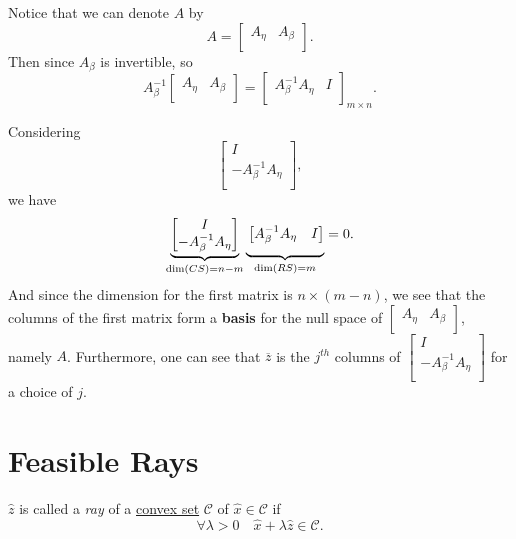 \begin{note}
	Notice that we can denote \(A\) by
	\[
		A = \begin{bmatrix}
			A_{\eta} & A_{\beta} \\
		\end{bmatrix}.
	\]
	Then since \(A_{\beta}\) is invertible, so
	\[
		A^{-1}_{\beta}\begin{bmatrix}
			A_{\eta} & A_{\beta} \\
		\end{bmatrix} = \begin{bmatrix}
			A^{-1}_{\beta}A_{\eta} & I \\
		\end{bmatrix}_{m\times n}.
	\]

	Considering
	\[
		\begin{bmatrix}
			I                       \\
			-A^{-1}_{\beta}A_{\eta} \\
		\end{bmatrix},
	\]
	we have
	\[
		\underbrace{
			\begin{bmatrix}
				I                       \\
				-A^{-1}_{\beta}A_{\eta} \\
			\end{bmatrix}}_{\dim(CS) = n-m}\underbrace{\vphantom{\begin{bmatrix}
					\\ \\
				\end{bmatrix}}\begin{bmatrix}
				A^{-1}_{\beta}A_{\eta} & I \\
			\end{bmatrix}}_{\dim(RS)=m} = 0.
	\]
	And since the dimension for the first matrix is \(n\times (m-n)\), we see that the columns of the first matrix form a \textbf{basis} for the null space of \(\begin{bmatrix}
		A_{\eta} & A_{\beta} \\
	\end{bmatrix}\), namely \(A\). Furthermore, one can see that \(\overline{z}\) is the \(j^{th}\) columns of \(\begin{bmatrix}
		I                       \\
		-A^{-1}_{\beta}A_{\eta} \\
	\end{bmatrix}\) for a choice of \(j\).
\end{note}

\section{Feasible Rays}
\begin{definition}[Ray]\label{def:ray}
	\(\hat{z}\) is called a \emph{ray} of a \hyperref[def:convex-set]{convex set} \(\mathcal{C}\) of \(\hat{x}\in \mathcal{C}\) if
	\[
		\forall \lambda>0\quad \hat{x} + \lambda \hat{z} \in \mathcal{C}.
	\]
	\begin{figure}[H]
		\centering
		\label{fig:ray}
	\end{figure}
\end{definition}

